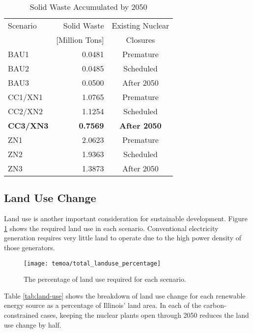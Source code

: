 \begin{table}[H]
  \centering
  \caption{Solid Waste Accumulated by 2050}
  \label{tab:total-waste}
  \begin{tabular}{lrc}
    \hline
    Scenario & Solid Waste & Existing Nuclear \\
    & [Million Tons]& Closures \\
    \hline
    BAU1 & 0.0481& Premature\\
    BAU2 & 0.0485& Scheduled\\
    BAU3 & 0.0500& After 2050\\
    CC1/XN1 & 1.0765 & Premature\\
    CC2/XN2 & 1.1254& Scheduled\\
    \textbf{CC3/XN3} & \textbf{0.7569}& \textbf{After 2050}\\
    ZN1 & 2.0623& Premature\\
    ZN2 & 1.9363& Scheduled\\
    ZN3 & 1.3873& After 2050\\
    \hline
  \end{tabular}
\end{table}

\subsection{Land Use Change}

Land use is another important consideration for sustainable development. Figure
\ref{fig:land-use-percentage} shows the required land use in each scenario.
Conventional electricity generation requires very little land to operate due
to the high power density of those generators.

\begin{figure}[H]
  \centering
  \texttt{[image: temoa/total\_landuse\_percentage]}
  \caption{The percentage of land use required for each scenario.}
  \label{fig:land-use-percentage}
\end{figure}

Table \ref{tab:land-use} shows the breakdown of land use change for each
renewable energy source as a percentage of Illinois' land area. In each of the
carbon-constrained cases, keeping the nuclear plants open through 2050 reduces
the land use change by half.

